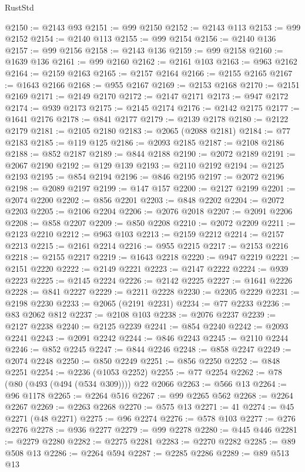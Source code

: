 \begin{lexlean}{RustStd}
\begin{coremodule}
@2150 := @2143 @93
@2151 := @99 @2150
@2152 := @2143 @113
@2153 := @99 @2152
@2154 := @2140 @113
@2155 := @99 @2154
@2156 := @2140 @136
@2157 := @99 @2156
@2158 := @2143 @136
@2159 := @99 @2158
@2160 := @1639 @136
@2161 := @99 @2160
@2162 := @2161 @103
@2163 := @963 @2162
@2164 := @2159 @2163
@2165 := @2157 @2164
@2166 := @2155 @2165
@2167 := @1643 @2166
@2168 := @955 @2167
@2169 := @2153 @2168
@2170 := @2151 @2169
@2171 := @2149 @2170
@2172 := @2147 @2171
@2173 := @947 @2172
@2174 := @939 @2173
@2175 := @2145 @2174
@2176 := @2142 @2175
@2177 := @1641 @2176
@2178 := @841 @2177
@2179 := @2139 @2178
@2180 := @2122 @2179
@2181 := @2105 @2180
@2183 := @2065 (@2088 @2181)
@2184 := @77 @2183
@2185 := @119 @125
@2186 := @2093 @2185
@2187 := @2108 @2186
@2188 := @852 @2187
@2189 := @844 @2188
@2190 := @2072 @2189
@2191 := @2067 @2190
@2192 := @129 @139
@2193 := @2110 @2192
@2194 := @2125 @2193
@2195 := @854 @2194
@2196 := @846 @2195
@2197 := @2072 @2196
@2198 := @2089 @2197
@2199 := @147 @157
@2200 := @2127 @2199
@2201 := @2074 @2200
@2202 := @856 @2201
@2203 := @848 @2202
@2204 := @2072 @2203
@2205 := @2106 @2204
@2206 := @2076 @2018
@2207 := @2091 @2206
@2208 := @858 @2207
@2209 := @850 @2208
@2210 := @2072 @2209
@2211 := @2123 @2210
@2212 := @963 @103
@2213 := @2159 @2212
@2214 := @2157 @2213
@2215 := @2161 @2214
@2216 := @955 @2215
@2217 := @2153 @2216
@2218 := @2155 @2217
@2219 := @1643 @2218
@2220 := @947 @2219
@2221 := @2151 @2220
@2222 := @2149 @2221
@2223 := @2147 @2222
@2224 := @939 @2223
@2225 := @2145 @2224
@2226 := @2142 @2225
@2227 := @1641 @2226
@2228 := @841 @2227
@2229 := @2211 @2228
@2230 := @2205 @2229
@2231 := @2198 @2230
@2233 := @2065 (@2191 @2231)
@2234 := @77 @2233
@2236 := @83 @2062 @812
@2237 := @2108 @103
@2238 := @2076 @2237
@2239 := @2127 @2238
@2240 := @2125 @2239
@2241 := @854 @2240
@2242 := @2093 @2241
@2243 := @2091 @2242
@2244 := @846 @2243
@2245 := @2110 @2244
@2246 := @852 @2245
@2247 := @844 @2246
@2248 := @858 @2247
@2249 := @2074 @2248
@2250 := @850 @2249
@2251 := @856 @2250
@2252 := @848 @2251
@2254 := @2236 (@1053 @2252)
@2255 := @77 @2254
@2262 := @78 (@80 (@493 (@494 (@534 @309)))) @22 @2066
@2263 := @566 @13
@2264 := @96 @1178
@2265 := @2264 @516
@2267 := @99 @2265 @562
@2268 := @2264 @2267
@2269 := @2263 @2268
@2270 := @575 @13
@2271 := 41
@2274 := @45 @2271 (@48 @2271)
@2275 := @96 @2274
@2276 := @578 @103
@2277 := @276 @2276
@2278 := @936 @2277
@2279 := @99 @2278
@2280 := @445 @446
@2281 := @2279 @2280
@2282 := @2275 @2281
@2283 := @2270 @2282
@2285 := @89 @508 @13
@2286 := @2264 @594
@2287 := @2285 @2286
@2289 := @89 @513 @13

\end{coremodule}
\end{lexlean}
